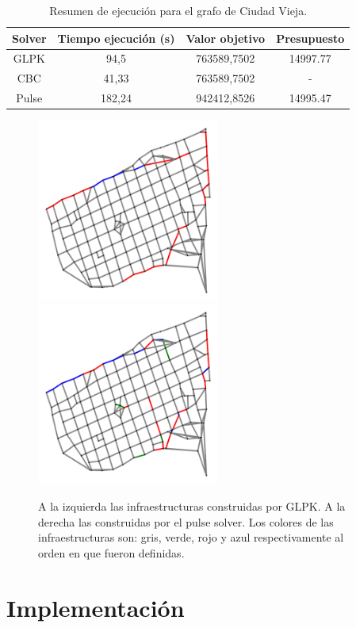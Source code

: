 \documentclass{article}
\begin{document}
  \begin{table}[h!]
    \centering
    \begin{tabular}{cccc}
      \toprule
      Solver & Tiempo ejecución (s) & Valor objetivo & Presupuesto \\
      \midrule
      GLPK & 94,5 & 763589,7502 & 14997.77 \\
      CBC & 41,33 & 763589,7502 & - \\
      Pulse & 182,24 & 942412,8526 & 14995.47 \\
      \bottomrule
    \end{tabular}
    \caption{Resumen de ejecución para el grafo de Ciudad Vieja.}\label{table:resultadosciudadvieja}
  \end{table}

  \begin{figure}[]
    \centering
    \includegraphics[width=6cm]{imgs/mdeo_med_glpk.png}
    \includegraphics[width=6cm]{imgs/mdeo_med_pulse.png}
    \caption{A la izquierda las infraestructuras construidas por GLPK. A la derecha las construidas por el pulse solver. Los colores de las infraestructuras son: gris, verde, rojo y azul respectivamente al orden en que fueron definidas.}
    \label{resultadosciudadvieja}
  \end{figure}


  \section*{Implementación}
\end{document}
